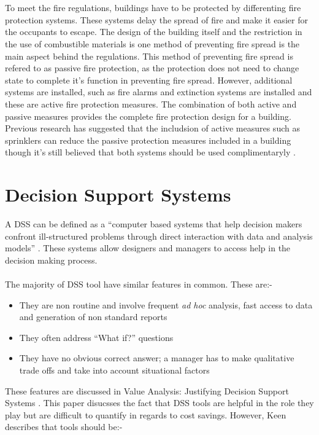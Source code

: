 \documentclass[table,a4paper,oneside]{book}
\begin{document}
\\
\\
To meet the fire regulations, buildings have to be protected by differenting fire protection systems. These systems delay the spread of fire and make it easier for the occupants to escape. The design of the building itself and the restriction in the use of combustible materials is one method of preventing fire spread is the main aspect behind the regulations. This method of preventing fire spread is refered to as passive fire protection, as the protection does not need to change state to complete it's function in preventing fire spread. However, additional systems are installed, such as fire alarms and extinction systems are installed and these are active fire protection measures. The combination of both active and passive measures provides the complete fire protection design for a building. Previous research has suggested that the includsion of active measures such as sprinklers can reduce the passive protection measures included in a building \citep{Baldwin1974} though it's still believed that both systems should be used complimentaryly \citep{Haack2004}.

\section{Decision Support Systems}
\label{sec:DSS}
A \ac{DSS} can be defined as a ``computer based systems that help decision makers confront ill-structured problems through direct interaction with data and analysis models'' \citep{SpragueWatson198906}. These systems allow designers and managers to access help in the decision making process.
\\
\\
The majority of \ac{DSS} tool have similar features in common. These are:-
\begin{itemize}
\item They are non routine and involve frequent \emph{ad hoc} analysis, fast access to data and generation of non standard reports
\item They often address “What if?” questions
\item They have no obvious correct answer; a manager has to make qualitative trade offs and take into account situational factors
\end{itemize}

These features are discussed in Value Analysis: Justifying Decision Support Systems \citep{Keen1981}. This paper disucsses the fact that \ac{DSS} tools are helpful in the role they play but are difficult to quantify in regards to cost savings. However, Keen describes that tools should be:-
\end{document}
